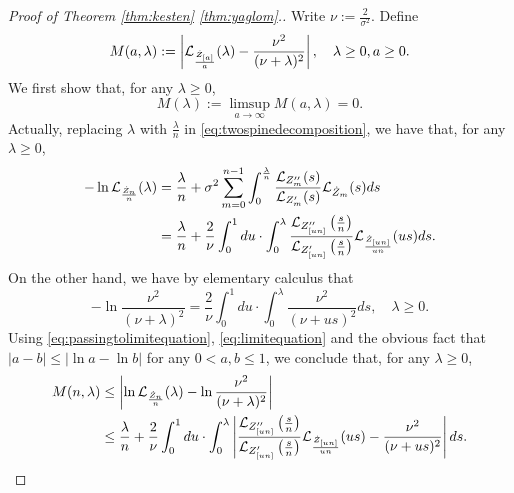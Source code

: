 \documentclass[12pt]{amsart}
\numberwithin{equation}{section}
\newcommand{\abs}[1]{\left| #1 \right|}
\newcommand{\expr}[1]{\left( #1 \right)}
\begin{document}
\medskip
\begin{proof}[Proof of Theorem \ref{thm:kesten} \eqref{thm:yaglom}.]
	Write $\nu:=\frac{2}{\sigma^2}$. Define
\begin{equation*}
		M(a,\lambda)
	:=
		\abs{\cL_{\frac{\dot Z_{[a]}}{a}}(\lambda)-
		\frac{\nu^2}{(\nu+\lambda)^2}},
	\quad
		\lambda \geq 0, 
		a\geq 0.
\end{equation*}
	We first show that, for any $\lambda\geq 0$,
\begin{equation}
\label{eq:Miszerofunction}
		M(\lambda)
	:=
		\limsup_{a\to\infty}M(a,\lambda)
	=
		0.
\end{equation}
	Actually, replacing $\lambda$ with $\frac{\lambda}{n}$ in \eqref{eq:twospinedecomposition}, we have that, for any $\lambda\geq 0$,
\begin{equation}
\label{eq:passingtolimitequation}
\begin{split}
		-\ln \cL_{\frac{\dot Z_n}{n}}(\lambda)
	&=
		\frac{\lambda}{n}+\sigma^2\sum_{m=0}^{n-1}\int_0^{\frac{\lambda}{n}} \frac{\cL_{Z''_m}(s)}{\cL_{Z'_m}(s)}\cL_{\dot Z_{m}}(s)ds
	\\&=
		\frac{\lambda}{n}+\frac{2}{\nu}\int_0^1 du \cdot \int_0^{\lambda} \frac{\cL_{Z''_{[un]}}\expr{\frac{s}{n}}}{\cL_{Z'_{[un]}}\expr{\frac{s}{n}}}\cL_{\frac{\dot Z_{[un]}}{un}}(us)ds.
\end{split}
\end{equation}
	On the other hand, we have by elementary calculus that
\begin{equation}
\label{eq:limitequation}
        -\ln\frac{\nu^2}{(\nu+\lambda)^2}
    =
		\frac{2}{\nu}\int_0^1du\cdot\int_0^\lambda \frac{\nu^2}{(\nu+us)^2}ds,
\quad \lambda\geq 0.
\end{equation}
	Using \eqref{eq:passingtolimitequation}, \eqref{eq:limitequation} and the obvious fact that $\abs{a-b}\leq\abs{\ln a-\ln b}$ for any $0<a,b\leq 1$, we conclude that, for any $\lambda\geq 0$,
\begin{equation}
\label{eq:inequalitybeforepassingtolimit}
\begin{split}
        M(n,\lambda)
    &\leq
		\abs{\ln \cL_{\frac{\dot Z_n}{n}}(\lambda)-\ln\frac{\nu^2}{(\nu+\lambda)^2}}
	\\&\leq
		\frac{\lambda}{n}
	+
	    \frac{2}{\nu}\int_0^1 du
	\cdot
	    \int_0^{\lambda} \abs{\frac{\cL_{Z''_{[un]}}\expr{\frac{s}{n}}}{\cL_{Z'_{[un]}}\expr{\frac{s}{n}}}\cL_{\frac{\dot Z_{[un]}}{un}}(us)- \frac{\nu^2}{(\nu+us)^2}}ds.

\end{split}
\end{equation}
\end{proof}
\end{document}
